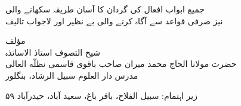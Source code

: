 \pstart\centering
{\urdufont\setlength{\baselineskip}{2em}
جميع ابواب افعال كى گردان كا آسان طريقہ سكھانے والى\\
نيز صرفى قواعد سے آگاہ كرنے والى بے نظير اور لاجواب تاليف\par}
\pend
{}
\pstart\centering\scalebox{1.1}{\wafiyahtitle}\par\pend
\vspace{1.2em}   %
\pstart\centering
{\urdufont\setlength{\baselineskip}{2em}
مؤلف\\
شيخ التصوف استاذ الاساتذہ\\
حضرت مولانا الحاج محمد ميران صاحب باقوى قاسمى نظلّه العالى\\
مدرس دار العلوم سبيل الرشاد، بنگلور\par}
\pend
{}
\pstart\centering
{\urdufont\setlength{\baselineskip}{2em}
زير اہتمام: سبيل الفلاح، باقر باغ، سعيد آباد، حيدرآباد ۵۹\par}
\pend
{}
